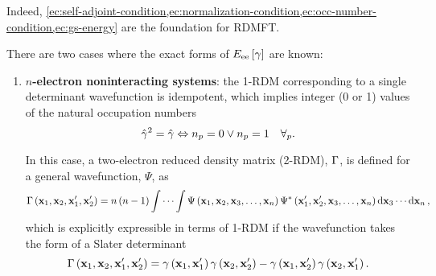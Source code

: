 Indeed, \cref{ec:self-adjoint-condition,ec:normalization-condition,ec:occ-number-condition,ec:gs-energy}
are the foundation for RDMFT.

There are two cases where the exact forms of $E_{\text{ee}} \left[ \gamma \right]$ are known:
\begin{enumerate}
    \item \textbf{$n$-electron noninteracting systems}: the 1-RDM corresponding
        to a single determinant wavefunction is idempotent, which implies integer
        (0 or 1) values of the natural occupation numbers 
        \begin{equation}
            \hat{\gamma}^{2} = \hat{\gamma}
            \Leftrightarrow
            n_p = 0  \vee n_p = 1
            \quad \forall_{p}
            .
        \end{equation}

        In this case, a two-electron reduced density matrix (2-RDM), $\Gamma$, is defined
        for a general wavefunction, $\Psi$, as 
        \begin{equation}
            \Gamma \left( \boldsymbol{\mathrm{x}}_1, \boldsymbol{\mathrm{x}}_2, \boldsymbol{\mathrm{x}}_1^{\prime}, \boldsymbol{\mathrm{x}}_2^{\prime} \right)
            =
            n\left( n - 1 \right) \idotsint
            \Psi \left( \boldsymbol{\mathrm{x}}_1, \boldsymbol{\mathrm{x}}_2, \boldsymbol{\mathrm{x}}_3, \ldots,  \boldsymbol{\mathrm{x}}_n \right)
            \Psi^{*} \left( \boldsymbol{\mathrm{x}}_1^{\prime}, \boldsymbol{\mathrm{x}}_2^{\prime}, \boldsymbol{\mathrm{x}}_3, \ldots,  \boldsymbol{\mathrm{x}}_n \right)
            \dd{ \boldsymbol{\mathrm{x}}_3} \cdots \dd{ \boldsymbol{\mathrm{x}}_n}
            ,
        \end{equation}
        which is explicitly expressible in terms of 1-RDM if the wavefunction takes
        the form of a Slater determinant 
        \begin{equation} \label{eq:HF-approximation-sordm-1}
            \Gamma \left( \boldsymbol{\mathrm{x}}_1, \boldsymbol{\mathrm{x}}_2, \boldsymbol{\mathrm{x}}_1^{\prime}, \boldsymbol{\mathrm{x}}_2^{\prime} \right)
            = 
            \gamma \left( \boldsymbol{\mathrm{x}}_1, \boldsymbol{\mathrm{x}}_1^{\prime} \right)
            \gamma \left( \boldsymbol{\mathrm{x}}_2, \boldsymbol{\mathrm{x}}_2^{\prime} \right)
            -
            \gamma \left( \boldsymbol{\mathrm{x}}_1, \boldsymbol{\mathrm{x}}_2^{\prime} \right)
            \gamma \left( \boldsymbol{\mathrm{x}}_2, \boldsymbol{\mathrm{x}}_1^{\prime} \right)
            .
        \end{equation}


\end{enumerate}
